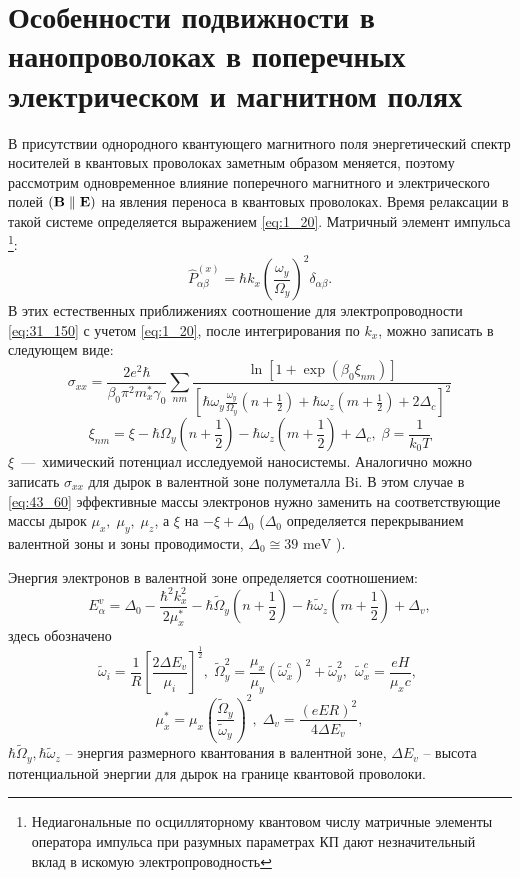 \section{Особенности подвижности в нанопроволоках в поперечных электрическом и магнитном полях} \label{sect4_3}
В присутствии однородного квантующего магнитного поля энергетический спектр носителей в квантовых проволоках заметным образом меняется, поэтому рассмотрим одновременное влияние поперечного магнитного и электрического полей $(\boldsymbol{\mathbf{B}}\parallel\boldsymbol{\mathbf{E}})$ на явления переноса в квантовых проволоках. Время релаксации в такой системе определяется выражением \eqref{eq:1_20}. Матричный элемент импульса \footnote{Недиагональные по осцилляторному квантовом числу матричные элементы оператора импульса при разумных параметрах КП дают незначительный вклад в искомую электропроводность}:
\[
\hat{P}^{(x)}_{\alpha \beta }=\hbar k_x{\left(\frac{\omega_y}{\Omega_y}\right)}^2 \delta_{\alpha \beta }.
\]
В этих естественных приближениях соотношение для электропроводности \eqref{eq:31_150} с учетом  \eqref{eq:1_20}, после интегрирования по $k_x$, можно записать в следующем виде:
\begin{equation} \label{eq:43_60}
\sigma_{xx}=\frac{2 e^2\hbar}{\beta_0 \pi^2 m^*_x \gamma_0} \sum_{nm}{\frac{\ln \left[1+\exp\left(\beta_0 \xi_{nm}\right)\right]}{\left[\hbar \omega_y \frac{\omega_y}{\Omega_y}\left(n+\frac{1}{2}\right)+\hbar \omega_z\left(m+\frac{1}{2}\right)+2\Delta_c\right]^2}} 
\end{equation}
\[
\xi_{nm}=\xi -\hbar \Omega_y \left(n+\frac{1}{2}\right)-\hbar \omega_z\left(m+\frac{1}{2}\right)+\Delta_c,\;
\beta =\frac{1}{k_0 T}
\]
$\xi $~---~химический потенциал исследуемой наносистемы. Аналогично можно записать $\sigma_{xx}$ для дырок в валентной зоне полуметалла Bi. В этом случае в \eqref{eq:43_60} эффективные массы электронов нужно заменить на соответствующие массы дырок $\mu_x,\; \mu_y,\; \mu_z$, а $\xi$  на $-\xi +\Delta_0$ ($\Delta_0$ определяется перекрыванием валентной зоны и зоны проводимости, $\Delta_0\cong 39\text{ meV}$ \cite{Levin2009a}). 

Энергия электронов в валентной зоне определяется соотношением:
\[
E^v_{\alpha }={\Delta }_0-\frac{{\hbar }^2k^2_x}{2{\mu }^*_x}-\hbar {\widetilde{\Omega }}_y\left(n+\frac{1}{2}\right)-\hbar {\widetilde{\omega }}_z\left(m+\frac{1}{2}\right)+{\Delta }_v,
\] 
здесь обозначено
\[
\widetilde{\omega}_i=\frac{1}{R}{\left[\frac{2 \Delta E_v}{\mu_i}\right]}^{\frac{1}{2}},\;
{\widetilde{\Omega }}^2_y=\frac{\mu_x}{\mu_y}{\left({\widetilde{\omega }}^c_x\right)}^2+{\widetilde{\omega }}^2_y,\ \ {\widetilde{\omega }}^c_x=\frac{eH}{{\mu }_xc},\;
\]
\[
\mu^*_x=\mu_x{\left(\frac{\widetilde{\Omega}_y}{\widetilde{\omega}_y}\right)}^2,\;
\Delta_v = \frac{{\left(eER\right)}^2}{4\Delta E_v},
\]
$\hbar {\widetilde{\Omega }}_y, \hbar {\widetilde{\omega }}_z$ -- энергия размерного квантования в валентной зоне, $\Delta E_v$ -- высота потенциальной энергии для дырок на границе квантовой проволоки.

